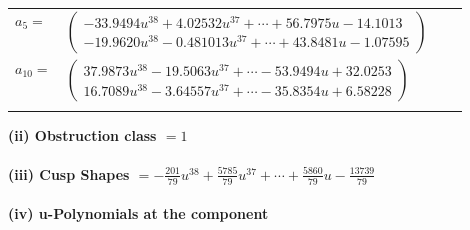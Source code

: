\documentclass[1p]{elsarticle_modified}
\theoremstyle{definition}
\begin{document}
\begin{tabular}{m{7pt} m{180pt} m{7pt} m{180pt} }
\flushright $a_{5}=$&$\begin{pmatrix}-33.9494 u^{38}+4.02532 u^{37}+\cdots+56.7975 u-14.1013\\-19.9620 u^{38}-0.481013 u^{37}+\cdots+43.8481 u-1.07595\end{pmatrix}$ \\
\flushright $a_{10}=$&$\begin{pmatrix}37.9873 u^{38}-19.5063 u^{37}+\cdots-53.9494 u+32.0253\\16.7089 u^{38}-3.64557 u^{37}+\cdots-35.8354 u+6.58228\end{pmatrix}$\\&\end{tabular}
\flushleft \textbf{(ii) Obstruction class $= 1$}\\~\\
\flushleft \textbf{(iii) Cusp Shapes $= -\frac{201}{79} u^{38}+\frac{5785}{79} u^{37}+\cdots+\frac{5860}{79} u-\frac{13739}{79}$}\\~\\
\newpage\renewcommand{\arraystretch}{1}
\flushleft \textbf{(iv) u-Polynomials at the component}\newline \\
\end{document}
